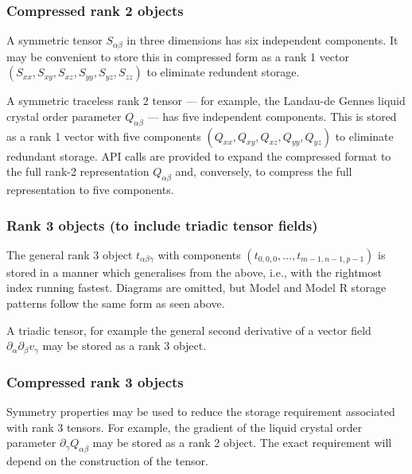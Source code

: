 
\subsubsection{Compressed rank 2 objects}

A symmetric tensor $S_{\alpha\beta}$ in three dimensions has six independent
components. It may be convenient to store this in compressed form as a
rank 1 vector $(S_{xx}, S_{xy}, S_{xz}, S_{yy}, S_{yz}, S_{zz})$ to eliminate
redundent storage.

A symmetric traceless rank 2 tensor --- for example, the Landau-de Gennes
liquid crystal order parameter $Q_{\alpha\beta}$ --- has five independent
components. This is stored as a rank 1 vector with five components
$(Q_{xx}, Q_{xy}, Q_{xz}, Q_{yy}, Q_{yz})$ to eliminate redundant
storage. API calls are provided to expand the compressed format to the
full rank-2 representation $Q_{\alpha\beta}$ and, conversely, to compress
the full representation to five components.

\subsubsection{Rank 3 objects (to include triadic tensor fields)}

The general rank 3 object $t_{\alpha\beta\gamma}$ with components
$(t_{0,0,0}, \ldots, t_{m-1,n-1,p-1})$ is stored in a manner which
generalises from the above, i.e., with the rightmost index running
fastest. Diagrams are omitted, but Model and Model R storage patterns
follow the same form as seen above.

A triadic tensor, for example the general second derivative of a vector
field $\partial_\alpha \partial_\beta v_\gamma$ may be stored as a rank
3 object.

\subsubsection{Compressed rank 3 objects}

Symmetry properties may be used to reduce the storage requirement
associated with rank 3 tensors. For example, the gradient of the
liquid crystal order parameter $\partial_\gamma Q_{\alpha\beta}$
may be stored as a rank 2 object. The exact requirement will depend
on the construction of the tensor.

%

